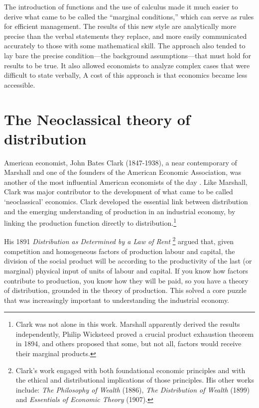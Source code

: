 
 The introduction of functions and the use of calculus made it much easier to  derive what came to be called the ``marginal conditions,'' which can serve as rules for efficient management. The results of this new style are analytically more precise than the verbal statements they replace, and more easily communicated accurately to those with some mathematical skill. The approach also tended to lay bare the precise condition---the background assumptions---that must hold for results to be true. It also allowed economists to analyze complex cases that were difficult to state verbally, A cost of this approach is that economics became less accessible.

\section{The Neoclassical theory of distribution}
American economist, John Bates Clark (1847-1938), a near contemporary of Marshall and one of the founders of the American Economic Association, was another of the most influential American economists of the day .  Like Marshall, Clark was major contributor to the development of what came to be called `neoclassical' economics. 
Clark developed the essential link between distribution and the emerging understanding of production in an industrial economy, by linking the production function directly to distribution.\footnote{Clark was not alone in this work. Marshall apparently derived the results independently, Philip Wicksteed proved a crucial product exhaustion theorem in 1894, and others proposed that some, but not all, factors would receive their marginal products.} 

His 1891 \textit{Distribution as Determined by a Law of Rent} \cite{clarkDistributionDeterminedLaw1891}\footnote{Clark's work engaged with both foundational economic principles and with the ethical and distributional implications of those principles. His other works include: \textit{The Philosophy of Wealth} (1886), \textit{The Distribution of Wealth} (1899) and \textit{Essentials of Economic Theory} (1907).} 
 argued that, given competition and homogeneous factors of production labour and capital, the division of the social product will be according to the productivity of the last (or marginal) physical input of units of labour and capital. If you know how factors contribute to production, you know how they will be paid, so you have a theory of distribution, grounded in the theory of production. This solved a core puzzle that was increasingly important to understanding the industrial economy.

